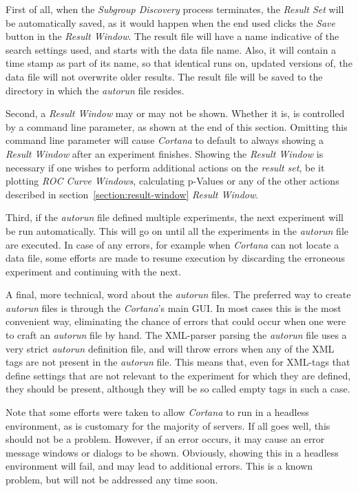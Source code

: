 \documentclass{article}
\begin{document}
First of all, when the \emph{Subgroup Discovery} process terminates, the \emph{Result Set} will be automatically saved, as it would happen when the end used clicks the \emph{Save} button in the \emph{Result Window}.
The result file will have a name indicative of the search settings used, and starts with the data file name.
Also, it will contain a time stamp as part of its name, so that identical runs on, updated versions of, the data file will not overwrite older results.
The result file will be saved to the directory in which the \emph{autorun} file resides.

Second, a \emph{Result Window} may or may not be shown.
Whether it is, is controlled by a command line parameter, as shown at the end of this section.
Omitting this command line parameter will cause \emph{Cortana} to default to always showing a \emph{Result Window} after an experiment finishes.
Showing the \emph{Result Window} is necessary if one wishes to perform additional actions on the \emph{result set}, be it plotting \emph{ROC Curve Windows}, calculating p-Values or any of the other actions described in section~\ref{section:result-window} \emph{Result Window}.

Third, if the \emph{autorun} file defined multiple experiments, the next experiment will be run automatically.
This will go on until all the experiments in the \emph{autorun} file are executed.
In case of any errors, for example when \emph{Cortana} can not locate a data file, some efforts are made to resume execution by discarding the erroneous experiment and continuing with the next.

A final, more technical, word about the \emph{autorun} files.
The preferred way to create \emph{autorun} files is through the \emph{Cortana}'s main GUI.
In most cases this is the most convenient way, eliminating the chance of errors that could occur when one were to craft an \emph{autorun} file by hand.
The XML-parser parsing the \emph{autorun} file uses a very strict \emph{autorun} definition file, and will throw errors when any of the XML tags are not present in the \emph{autorun} file.
This means that, even for XML-tags that define settings that are not relevant to the experiment for which they are defined, they should be present, although they will be so called empty tags in such a case.

Note that some efforts were taken to allow \emph{Cortana} to run in a headless environment, as is customary for the majority of servers.
If all goes well, this should not be a problem.
However, if an error occurs, it may cause an error message windows or dialogs to be shown.
Obviously, showing this in a headless environment will fail, and may lead to additional errors.
This is a known problem, but will not be addressed any time soon.
\end{document}

